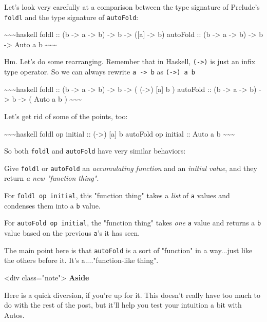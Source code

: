 \documentclass[]{article}
\begin{document}
Let's look very carefully at a comparison between the type signature of
Prelude's \texttt{foldl} and the type signature of \texttt{autoFold}:

\textasciitilde{}\textasciitilde{}\textasciitilde{}haskell foldl :: (b
-\textgreater{} a -\textgreater{} b) -\textgreater{} b -\textgreater{} ({[}a{]}
-\textgreater{} b) autoFold :: (b -\textgreater{} a -\textgreater{} b)
-\textgreater{} b -\textgreater{} Auto a b
\textasciitilde{}\textasciitilde{}\textasciitilde{}

Hm. Let's do some rearranging. Remember that in Haskell,
\texttt{(-\textgreater{})} is just an infix type operator. So we can always
rewrite \texttt{a\ -\textgreater{}\ b} as \texttt{(-\textgreater{})\ a\ b}

\textasciitilde{}\textasciitilde{}\textasciitilde{}haskell foldl :: (b
-\textgreater{} a -\textgreater{} b) -\textgreater{} b -\textgreater{} (
(-\textgreater{}) {[}a{]} b ) autoFold :: (b -\textgreater{} a -\textgreater{}
b) -\textgreater{} b -\textgreater{} ( Auto a b )
\textasciitilde{}\textasciitilde{}\textasciitilde{}

Let's get rid of some of the points, too:

\textasciitilde{}\textasciitilde{}\textasciitilde{}haskell foldl op initial ::
(-\textgreater{}) {[}a{]} b autoFold op initial :: Auto a b
\textasciitilde{}\textasciitilde{}\textasciitilde{}

So both \texttt{foldl} and \texttt{autoFold} have very similar behaviors:

Give \texttt{foldl} or \texttt{autoFold} an \emph{accumulating function} and an
\emph{initial value}, and they return \emph{a new "function thing"}.

For \texttt{foldl\ op\ initial}, this "function thing" takes a \emph{list} of
\texttt{a} values and condenses them into a \texttt{b} value.

For \texttt{autoFold\ op\ initial}, the "function thing" takes \emph{one}
\texttt{a} value and returns a \texttt{b} value based on the previous
\texttt{a}'s it has seen.

The main point here is that \texttt{autoFold} is a sort of "function" in a
way...just like the others before it. It's a...."function-like thing".

\textless{}div class="note"\textgreater{} \textbf{Aside}

Here is a quick diversion, if you're up for it. This doesn't really have too
much to do with the rest of the post, but it'll help you test your intuition a
bit with Autos.
\end{document}
